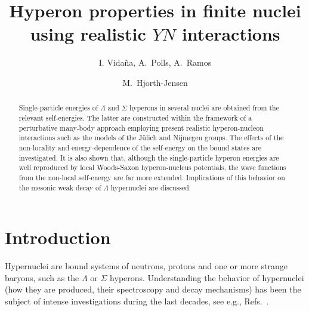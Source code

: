 



\draft


\title{Hyperon properties in finite nuclei using 
       realistic $YN$ interactions}

\author{I. Vida\~na, A.\ Polls, A.\ Ramos}

\address{Departament d'Estructura i Constituents de la Mat\`eria,
         Universitat de Barcelona, E-08028 Barcelona, Spain}


\author{M.\ Hjorth-Jensen}


\address{ Nordita, Blegdamsvej 17, DK-2100 K\o benhavn \O, Denmark}



\maketitle
\bigskip

\begin{abstract}
Single-particle energies of $\Lambda$ and $\Sigma$ hyperons
in several nuclei are obtained from the relevant
self-energies.
The latter are constructed within the framework of a perturbative
many-body approach  
employing present realistic hyperon-nucleon interactions
such as the models of the J\"{u}lich and Nijmegen groups.
The effects of the non-locality and
energy-dependence of the self-energy on the bound states are
investigated.
It is also shown that, although the single-particle hyperon energies are well
reproduced by local Woods-Saxon hyperon-nucleus potentials, the wave functions
from the non-local self-energy are far more extended. Implications of
this
behavior on the mesonic weak decay of $\Lambda$ hypernuclei are discussed.
\end{abstract}

\bigskip
{}

\bigskip
\newpage


\section{Introduction}

Hypernuclei are bound systems of neutrons, protons and one or more strange 
baryons, such as the $\Lambda$ or $\Sigma$ hyperons. Understanding the
behavior of hypernuclei (how they are produced, their spectroscopy and
decay mechanisms) has been the subject of intense investigations
during the last decades, see e.g., Refs.\
\cite{gal77,povh78,bando85,dover89,oset90,cohen90,bando90,gibson95,akaishi97,oset98}.

